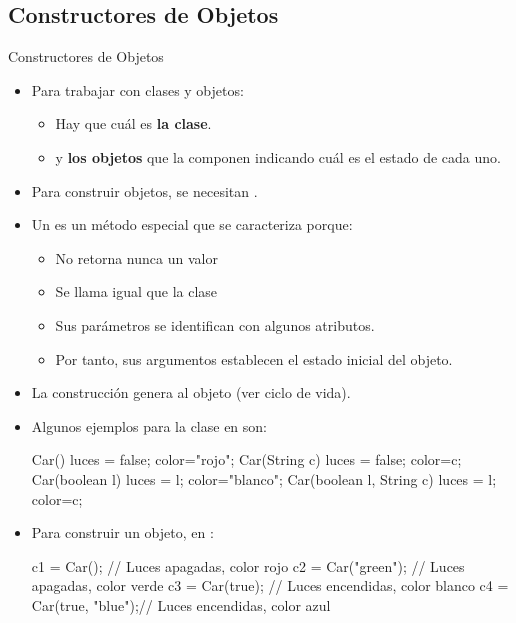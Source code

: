 \documentclass[10pt,envcountsect,spanish]{beamer}
\begin{document}
\subsection{Constructores de Objetos}

\begin{frame}[fragile]{Constructores de Objetos}


\begin{itemize}
\item Para trabajar con clases y objetos:
	\begin{itemize}
	\item Hay que  cuál es  \textbf{la clase}.
	\item y  \textbf{los objetos} que la componen indicando cuál es el estado de cada uno.
	\end{itemize}

\item Para construir objetos, se necesitan .

\item Un  es un método especial que se caracteriza porque:
	\begin{itemize}
	\item No retorna nunca un valor
	\item Se llama igual que la clase
	\item Sus parámetros se identifican con algunos atributos.
	\item[] Por tanto, sus argumentos establecen el estado inicial del objeto.
	\end{itemize}

\item La construcción genera  al objeto (ver ciclo de vida).

\item Algunos ejemplos para la clase  en  son:

{\footnotesize
\begin{code}[]%
  Car()                    {luces = false;  color="rojo";}
  Car(String c)            {luces = false;  color=c;}
  Car(boolean l)           {luces = l;  color="blanco";}
  Car(boolean l, String c) {luces = l;  color=c;}
\end{code}
}


\item Para construir un objeto, en :

{\small
\begin{code}[basicstyle=\ttfamily\footnotesize]
c1 = Car();            // Luces apagadas, color rojo
c2 = Car("green");     // Luces apagadas, color verde
c3 = Car(true);        // Luces encendidas, color blanco
c4 = Car(true, "blue");// Luces encendidas, color azul
\end{code}
}


\end{itemize}
\end{frame}
\end{document}
